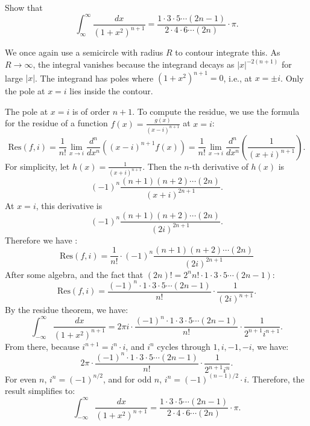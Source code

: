 \documentclass[12pt]{article}
\begin{document}
\begin{statement}[6]
  Show that 
  $$ \int^{\infty}_{\infty} \frac{dx}{(1+x^2)^{n+1}} = \frac{1 \cdot 3 \cdot 5 \cdots (2n-1)}{2 \cdot 4 \cdot 6 \cdots (2n)} \cdot \pi. $$
\end{statement}
\begin{newproof}
    We once again use a semicircle with radius $R$ to contour integrate this. As $R \to \infty$, the integral vanishes because the integrand decays as $|x|^{-2(n+1)}$ for large $|x|$.
    The integrand has poles where $(1+x^2)^{n+1} = 0$, i.e., at $x = \pm i$. Only the pole at $x = i$ lies inside the contour.
    \par The pole at $x = i$ is of order $n+1$. To compute the residue, we use the formula for the residue of a function $f(x) = \frac{g(x)}{(x-i)^{n+1}}$ at $x = i$:
    $$ \text{Res}(f, i) = \frac{1}{n!} \lim_{x \to i} \frac{d^n}{dx^n} \left( (x-i)^{n+1} f(x) \right) = \frac{1}{n!} \lim_{x \to i} \frac{d^n}{dx^n} \left( \frac{1}{(x+i)^{n+1}} \right). $$ 
    For simplicity, let $h(x) = \frac{1}{(x+i)^{n+1}}$. Then the $n$-th derivative of $h(x)$ is
    $$ (-1)^n \frac{(n+1)(n+2)\cdots(2n)}{(x+i)^{2n+1}}. $$
    At $x = i$, this derivative is
    $$ (-1)^n \frac{(n+1)(n+2)\cdots(2n)}{(2i)^{2n+1}}. $$
    Therefore we have :
    $$ \text{Res}(f, i) = \frac{1}{n!} \cdot (-1)^n \frac{(n+1)(n+2)\cdots(2n)}{(2i)^{2n+1}} $$
    After some algebra, and the fact that $(2n)! = 2^n n! \cdot 1 \cdot 3 \cdot 5 \cdots (2n-1)$:
    $$ \text{Res}(f, i) = \frac{(-1)^n \cdot 1 \cdot 3 \cdot 5 \cdots (2n-1)}{n!} \cdot \frac{1}{(2i)^{n+1}}. $$
    By the residue theorem, we have:
    $$ \int^{\infty}_{-\infty} \frac{dx}{(1+x^2)^{n+1}} = 2\pi i \cdot \frac{(-1)^n \cdot 1 \cdot 3 \cdot 5 \cdots (2n-1)}{n!} \cdot \frac{1}{2^{n+1} i^{n+1}}. $$
    From there, because $i^{n+1} = i^n \cdot i$, and $i^n$ cycles through $1, i, -1, -i$, we have:
    $$ 2\pi \cdot \frac{(-1)^n \cdot 1 \cdot 3 \cdot 5 \cdots (2n-1)}{n!} \cdot \frac{1}{2^{n+1} i^n}. $$
    For even $n$, $i^n = (-1)^{n/2}$, and for odd $n$, $i^n = (-1)^{(n-1)/2} \cdot i$. Therefore, the result simplifies to:
    $$ \int^{\infty}_{-\infty} \frac{dx}{(1+x^2)^{n+1}} = \frac{1 \cdot 3 \cdot 5 \cdots (2n-1)}{2 \cdot 4 \cdot 6 \cdots (2n)} \cdot \pi. $$
\end{newproof}

\end{document}
